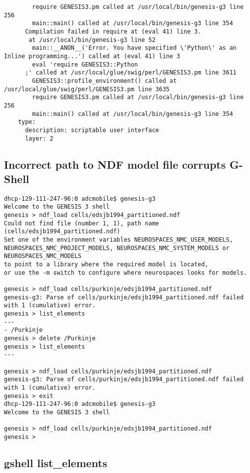 \documentclass[12pt]{article}
\begin{document}
\begin{verbatim}
      	require GENESIS3.pm called at /usr/local/bin/genesis-g3 line 256
      	main::main() called at /usr/local/bin/genesis-g3 line 354
      Compilation failed in require at (eval 41) line 3.
       at /usr/local/bin/genesis-g3 line 52
      	main::__ANON__('Error. You have specified \'Python\' as an Inline programming...') called at (eval 41) line 3
      	eval 'require GENESIS3::Python
      ;' called at /usr/local/glue/swig/perl/GENESIS3.pm line 3611
      	GENESIS3::profile_environment() called at /usr/local/glue/swig/perl/GENESIS3.pm line 3635
      	require GENESIS3.pm called at /usr/local/bin/genesis-g3 line 256
      	main::main() called at /usr/local/bin/genesis-g3 line 354
    type:
      description: scriptable user interface
      layer: 2
\end{verbatim}


\subsection{Incorrect path to NDF model file corrupts G-Shell}
\begin{verbatim}
dhcp-129-111-247-96:0 adcmobile$ genesis-g3
Welcome to the GENESIS 3 shell
genesis > ndf_load cells/edsjb1994_partitioned.ndf
Could not find file (number 1, 1), path name (cells/edsjb1994_partitioned.ndf)
Set one of the environment variables NEUROSPACES_NMC_USER_MODELS,
NEUROSPACES_NMC_PROJECT_MODELS, NEUROSPACES_NMC_SYSTEM_MODELS or NEUROSPACES_NMC_MODELS
to point to a library where the required model is located,
or use the -m switch to configure where neurospaces looks for models.

genesis > ndf_load cells/purkinje/edsjb1994_partitioned.ndf
genesis-g3: Parse of cells/purkinje/edsjb1994_partitioned.ndf failed with 1 (cumulative) error.
genesis > list_elements
---
- /Purkinje
genesis > delete /Purkinje
genesis > list_elements
---

genesis > ndf_load cells/purkinje/edsjb1994_partitioned.ndf
genesis-g3: Parse of cells/purkinje/edsjb1994_partitioned.ndf failed with 1 (cumulative) error.
genesis > exit
dhcp-129-111-247-96:0 adcmobile$ genesis-g3
Welcome to the GENESIS 3 shell

genesis > ndf_load cells/purkinje/edsjb1994_partitioned.ndf
genesis >
\end{verbatim}


\subsection{gshell list\_elements}
\end{document}
